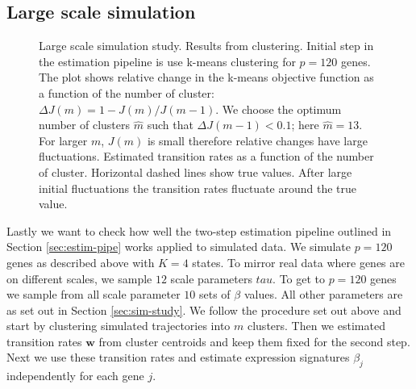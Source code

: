 \subsection{Large scale simulation}
\label{sec:large-scale-model}

\begin{figure}
  \centering
  \caption{Large scale simulation study. Results from clustering.  Initial step in the estimation pipeline is use k-means clustering for $p=120$ genes. The plot shows relative change in the k-means objective function as a function of the number of cluster: $\Delta J(m) = 1 - J(m) / J(m - 1)$. We choose the optimum number of clusters $\hat{m}$ such that $\Delta J(m - 1) < 0.1$; here $\hat{m} = 13$. For larger $m$, $J(m)$ is small therefore relative changes have large fluctuations.  Estimated transition rates as a function of the number of cluster. Horizontal dashed lines show true values. After large initial fluctuations the transition rates fluctuate around the true value.}
  \label{fig:lrg-sim-clust}
\end{figure}


Lastly we want to check how well the two-step estimation pipeline outlined in Section \ref{sec:estim-pipe} works applied to simulated data. We simulate $p=120$ genes as described above with $K=4$ states. To mirror real data where genes are on different scales, we sample $12$ scale parameters $tau$. To get to $p=120$ genes we sample from all scale parameter $10$ sets of $\beta$ values. All other parameters are as set out in Section \ref{sec:sim-study}. We follow the procedure set out above and start by clustering simulated trajectories into $m$ clusters. Then we estimated transition rates $\mathbf{w}$ from cluster centroids and keep them fixed for the second step. Next we use these transition rates and estimate expression signatures $\beta_j$ independently for each gene $j$.




